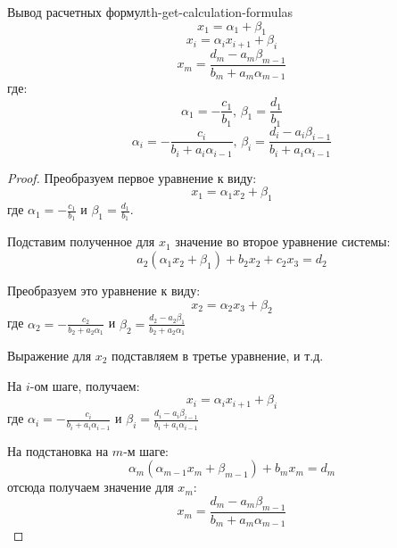 \documentclass[14pt]{extarticle}
\begin{document}
        \begin{theorem}{Вывод расчетных формул}{th-get-calculation-formulas}
            $$x_{1} = \alpha_{1} + \beta_{1}$$
            $$x_{i} = \alpha_{i}x_{i+1} + \beta_{i}$$
            $$x_{m} = \frac{d_{m} - a_{m}\beta_{m-1}}{b_{m} + a_{m}\alpha_{m-1}}$$
            где: 
                $$\alpha_{1} = -\frac{c_{1}}{b_{1}} \text{, } \beta_{1} = \frac{d_{1}}{b_{1}}$$
                $$\alpha_{i} = -\frac{c_{i}}{b_{i} + a_{i}\alpha_{i-1}} \text{, } \beta_{i} = \frac{d_{i} - a_{i}\beta_{i-1}}{b_{i} + a_{i}\alpha_{i-1}}$$
        
            \begin{proof}
                Преобразуем первое уравнение к виду:
                $$x_{1} = \alpha_{1}x_{2} + \beta_{1}$$
                где $\alpha_{1} = -\frac{c_{1}}{b_{1}}$ и $\beta_{1} = \frac{d_{1}}{b_{1}}$.

                \vspace{\baselineskip}

                Подставим полученное для $x_{1}$ значение во второе уравнение системы:
                $$a_{2}(\alpha_{1}x_{2} + \beta_{1}) + b_{2}x_{2} + c_{2}x_{3} = d_{2}$$

                Преобразуем это уравнение к виду:
                $$x_{2} = \alpha_{2}x_{3} + \beta_{2}$$
                где $\alpha_{2} = -\frac{c_{2}}{b_{2} + a_{2}\alpha_{1}}$ и $\beta_{2} = \frac{d_{2} - a_{2}\beta_{1}}{b_{2} + a_{2}\alpha_{1}}$

                Выражение для $x_{2}$ подставляем в третье уравнение, и т.д.

                \vspace{\baselineskip}

                На $i$-ом шаге, получаем:
                $$x_{i} = \alpha_{i}x_{i+1} + \beta_{i}$$
                где $\alpha_{i} = -\frac{c_{i}}{b_{i} + a_{i}\alpha_{i-1}}$ и $\beta_{i} = \frac{d_{i} - a_{i}\beta_{i-1}}{b_{i} + a_{i}\alpha_{i-1}}$
            
                \vspace{\baselineskip}

                На подстановка на $m$-м шаге:
                $$\alpha_{m}(\alpha_{m-1}x_{m} + \beta_{m-1}) + b_{m}x_{m} = d_{m}$$
                отсюда получаем значение для $x_{m}$:
                $$x_{m} = \frac{d_{m} - a_{m}\beta_{m-1}}{b_{m} + a_{m}\alpha_{m-1}}$$
            \end{proof}
        \end{theorem}
\end{document}
